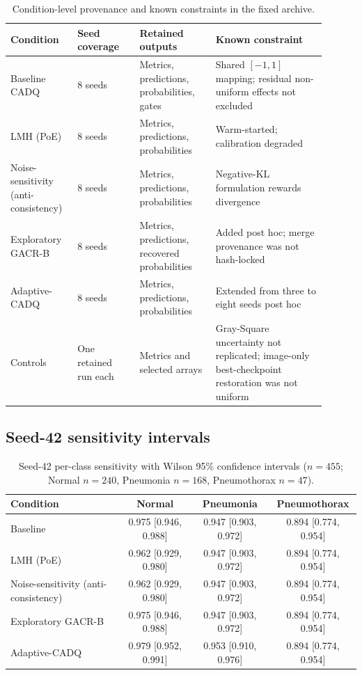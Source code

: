 \documentclass[a4paper,fleqn]{cas-sc}
\begin{document}
\begin{table}[pos=H]
\centering
\caption{Condition-level provenance and known constraints in the fixed archive.}
\label{tab:s-provenance}
\scriptsize
\begin{tabular}{p{0.18\linewidth}p{0.18\linewidth}p{0.22\linewidth}p{0.32\linewidth}}
\toprule
Condition & Seed coverage & Retained outputs & Known constraint \\
\midrule
Baseline CADQ & 8 seeds & Metrics, predictions, probabilities, gates & Shared $[-1,1]$ mapping; residual non-uniform effects not excluded \\
LMH (PoE) & 8 seeds & Metrics, predictions, probabilities & Warm-started; calibration degraded \\
Noise-sensitivity (anti-consistency) & 8 seeds & Metrics, predictions, probabilities & Negative-KL formulation rewards divergence \\
Exploratory GACR-B & 8 seeds & Metrics, predictions, recovered probabilities & Added post hoc; merge provenance was not hash-locked \\
Adaptive-CADQ & 8 seeds & Metrics, predictions, probabilities & Extended from three to eight seeds post hoc \\
Controls & One retained run each & Metrics and selected arrays & Gray-Square uncertainty not replicated; image-only best-checkpoint restoration was not uniform \\
\bottomrule
\end{tabular}
\end{table}

\subsection{Seed-42 sensitivity intervals}

\begin{table}[pos=H]
\centering
\caption{Seed-42 per-class sensitivity with Wilson 95\% confidence intervals
($n=455$; Normal $n=240$, Pneumonia $n=168$, Pneumothorax $n=47$).}
\label{tab:s-wilson}
\scriptsize
\begin{tabular}{lccc}
\toprule
Condition & Normal & Pneumonia & Pneumothorax \\
\midrule
Baseline & 0.975 [0.946, 0.988] & 0.947 [0.903, 0.972] & 0.894 [0.774, 0.954] \\
LMH (PoE) & 0.962 [0.929, 0.980] & 0.947 [0.903, 0.972] & 0.894 [0.774, 0.954] \\
Noise-sensitivity (anti-consistency) & 0.962 [0.929, 0.980] & 0.947 [0.903, 0.972] & 0.894 [0.774, 0.954] \\
Exploratory GACR-B & 0.975 [0.946, 0.988] & 0.947 [0.903, 0.972] & 0.894 [0.774, 0.954] \\
Adaptive-CADQ & 0.979 [0.952, 0.991] & 0.953 [0.910, 0.976] & 0.894 [0.774, 0.954] \\
\bottomrule
\end{tabular}
\end{table}
\end{document}
